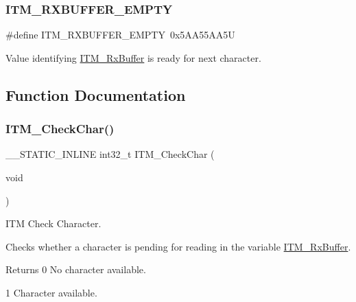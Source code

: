 \subsubsection{\texorpdfstring{I\+T\+M\+\_\+\+R\+X\+B\+U\+F\+F\+E\+R\+\_\+\+E\+M\+P\+TY}{ITM\_RXBUFFER\_EMPTY}\hspace{0.1cm}{\footnotesize\ttfamily [4/4]}}
{\footnotesize\ttfamily \#define I\+T\+M\+\_\+\+R\+X\+B\+U\+F\+F\+E\+R\+\_\+\+E\+M\+P\+TY~0x5\+A\+A55\+A\+A5U}

Value identifying \mbox{\hyperlink{group___c_m_s_i_s__core___debug_functions_ga12e68e55a7badc271b948d6c7230b2a8}{I\+T\+M\+\_\+\+Rx\+Buffer}} is ready for next character. 

\subsection{Function Documentation}
\mbox{\label{group___c_m_s_i_s__core___debug_functions_gae61ce9ca5917735325cd93b0fb21dd29}} 
\subsubsection{\texorpdfstring{I\+T\+M\+\_\+\+Check\+Char()}{ITM\_CheckChar()}}
{\footnotesize\ttfamily \+\_\+\+\_\+\+S\+T\+A\+T\+I\+C\+\_\+\+I\+N\+L\+I\+NE int32\+\_\+t I\+T\+M\+\_\+\+Check\+Char (\begin{DoxyParamCaption}\item[{void}]{ }\end{DoxyParamCaption})}



I\+TM Check Character. 

Checks whether a character is pending for reading in the variable \mbox{\hyperlink{group___c_m_s_i_s__core___debug_functions_ga12e68e55a7badc271b948d6c7230b2a8}{I\+T\+M\+\_\+\+Rx\+Buffer}}. \begin{DoxyReturn}{Returns}
0 No character available. 

1 Character available. 
\end{DoxyReturn}
\mbox{\label{group___c_m_s_i_s__core___debug_functions_gac3ee2c30a1ac4ed34c8a866a17decd53}} 
